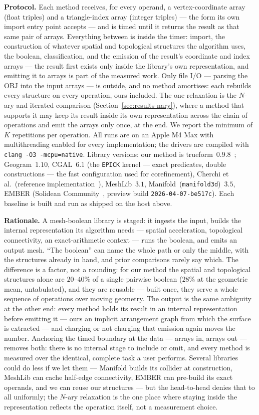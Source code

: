 \documentclass{egpubl}
\begin{document}
\textbf{Protocol.} Each method receives, for every operand, a vertex-coordinate array (float triples) and a triangle-index array (integer triples) --- the form its own import entry point accepts --- and is timed until it returns the result as that same pair of arrays. Everything between is inside the timer: import, the construction of whatever spatial and topological structures the algorithm uses, the boolean, classification, and the emission of the result's coordinate and index arrays --- the result first exists only inside the library's own representation, and emitting it to arrays is part of the measured work. Only file I/O --- parsing the OBJ into the input arrays --- is outside, and no method amortises: each rebuilds every structure on every operation, ours included. The one relaxation is the $N$-ary and iterated comparison (Section~\ref{sec:results-nary}), where a method that supports it may keep its result inside its own representation across the chain of operations and emit the arrays only once, at the end. We report the minimum of $K$ repetitions per operation. All runs are on an Apple M4 Max with multithreading enabled for every implementation; the drivers are compiled with \texttt{clang -O3 -mcpu=native}. Library versions: our method is trueform~$0.9.8$~\cite{trueform2025}; Geogram~$1.10$, CGAL~$6.1$ (the \texttt{EPICK} kernel --- exact predicates, double constructions --- the fast configuration used for corefinement), Cherchi et al.\ (reference implementation~\cite{CherchiImpl}), MeshLib~$3.1$, Manifold~(\texttt{manifold3d})~$3.5$, EMBER (Solidean Community~\cite{Solidean}, preview build \texttt{2026-04-07-be517c}). Each baseline is built and run as shipped on the host above.

\textbf{Rationale.} A mesh-boolean library is staged: it ingests the input, builds the internal representation its algorithm needs --- spatial acceleration, topological connectivity, an exact-arithmetic context --- runs the boolean, and emits an output mesh. ``The boolean'' can name the whole path or only the middle, with the structures already in hand, and prior comparisons rarely say which. The difference is a factor, not a rounding: for our method the spatial and topological structures alone are $20$--$40\%$ of a single pairwise boolean ($28\%$ at the geometric mean, untabulated), and they are reusable --- built once, they serve a whole sequence of operations over moving geometry. The output is the same ambiguity at the other end: every method holds its result in an internal representation before emitting it --- ours an implicit arrangement graph from which the surface is extracted --- and charging or not charging that emission again moves the number. Anchoring the timed boundary at the data --- arrays in, arrays out --- removes both: there is no internal stage to include or omit, and every method is measured over the identical, complete task a user performs. Several libraries could do less if we let them --- Manifold builds its collider at construction, MeshLib can cache half-edge connectivity, EMBER can pre-build its exact operands, and we can reuse our structures --- but the head-to-head denies that to all uniformly; the $N$-ary relaxation is the one place where staying inside the representation reflects the operation itself, not a measurement choice.
\end{document}
